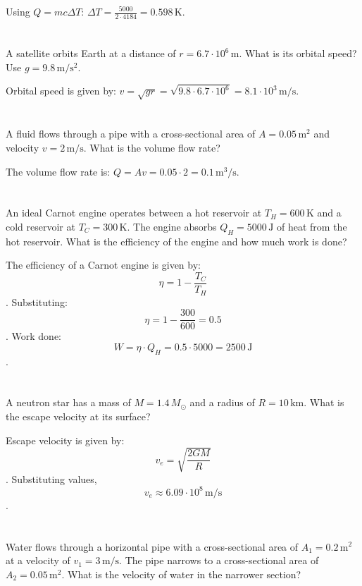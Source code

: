\documentclass{article}
\begin{document}
Using \( Q = m c \Delta T \): \( \Delta T = \frac{5000}{2 \cdot 4184} = 0.598 \, \mathrm{K} \).

\section{}
A satellite orbits Earth at a distance of \( r = 6.7 \cdot 10^6 \, \mathrm{m} \). What is its orbital speed? Use \( g = 9.8 \, \mathrm{m/s^2} \).

Orbital speed is given by: \( v = \sqrt{g r} = \sqrt{9.8 \cdot 6.7 \cdot 10^6} = 8.1 \cdot 10^3 \, \mathrm{m/s} \).

\section{}
A fluid flows through a pipe with a cross-sectional area of \( A = 0.05 \, \mathrm{m^2} \) and velocity \( v = 2 \, \mathrm{m/s} \). What is the volume flow rate?

The volume flow rate is: \( Q = A v = 0.05 \cdot 2 = 0.1 \, \mathrm{m^3/s} \).

\section{}
An ideal Carnot engine operates between a hot reservoir at \( T_H = 600 \, \mathrm{K} \) and a cold reservoir at \( T_C = 300 \, \mathrm{K} \). The engine absorbs \( Q_H = 5000 \, \mathrm{J} \) of heat from the hot reservoir. What is the efficiency of the engine and how much work is done?

The efficiency of a Carnot engine is given by: \[ \eta = 1 - \frac{T_C}{T_H} \]. Substituting: \[ \eta = 1 - \frac{300}{600} = 0.5 \]. Work done: \[ W = \eta \cdot Q_H = 0.5 \cdot 5000 = 2500 \, \mathrm{J} \].

\section{}
A neutron star has a mass of \( M = 1.4 \, M_\odot \) and a radius of \( R = 10 \, \mathrm{km} \). What is the escape velocity at its surface?

Escape velocity is given by: \[ v_e = \sqrt{\frac{2 G M}{R}} \]. Substituting values, \[ v_e \approx 6.09 \cdot 10^8 \, \mathrm{m/s} \].

\section{}
Water flows through a horizontal pipe with a cross-sectional area of \( A_1 = 0.2 \, \mathrm{m^2} \) at a velocity of \( v_1 = 3 \, \mathrm{m/s} \). The pipe narrows to a cross-sectional area of \( A_2 = 0.05 \, \mathrm{m^2} \). What is the velocity of water in the narrower section?
\end{document}
